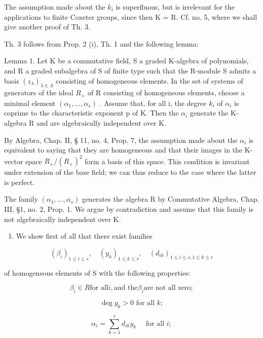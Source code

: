 The assumption made about the \(k_{i}\) is superfluous, but is irrelevant for the applications to finite Coxeter groups, since then K = R. Cf. no. 5, where we shall give another proof of Th. 3.

Th. 3 follows from Prop. 2 (i), Th. 1 and the following lemma:

Lemma 1. Let K be a commutative field, S a graded K-algebra of polynomials, and R a graded subalgebra of S of finite type such that the R-module S admits a basis \((z_{\lambda})_{\lambda \in \Lambda}\) consisting of homogeneous elements. In the set of systems of generators of the ideal \(R_{+}\) of R consisting of homogeneous elements, choose a minimal element \((\alpha_{1}, \ldots, \alpha_{s})\) . Assume that, for all i, the degree \(k_{i}\) of \(\alpha_{i}\) is coprime to the characteristic exponent p of K. Then the \(\alpha_{i}\) generate the K-algebra R and are algebraically independent over K.

By Algebra, Chap. II, § 11, no. 4, Prop. 7, the assumption made about the \(\alpha_{i}\) is equivalent to saying that they are homogeneous and that their images in the K-vector space \(R_{+}/(R_{+})^{2}\) form a basis of this space. This condition is invariant under extension of the base field; we can thus reduce to the case where the latter is perfect.

The family \((\alpha_{1},\ldots,\alpha_{s})\) generates the algebra R by Commutative Algebra, Chap. III, §1, no. 2, Prop. 1. We argue by contradiction and assume that this family is not algebraically independent over K.

\begin{enumerate}
\def\labelenumi{\arabic{enumi})}
\tightlist
\item
  We show first of all that there exist families
\end{enumerate}

\[
\left(\beta_ {i}\right) _ {1 \leqslant i \leqslant s}, \quad \left(y _ {k}\right) _ {1 \leqslant k \leqslant r}, \quad \left(d _ {i k}\right) _ {1 \leqslant i \leqslant s, 1 \leqslant k \leqslant r}
\]

of homogeneous elements of S with the following properties:

\[
\beta_ {i} \in R \text {for all} i, \text {and the} \beta_ {i} \text {are not all zero};\tag{7}
\]

\[
\deg y _ {k} > 0 \text {   for   all   } k;\tag{8}
\]

\[
\alpha_ {i} = \sum_ {k = 1} ^ {r} d _ {i k} y _ {k} \quad \text { for   all } i;\tag{9}
\]

